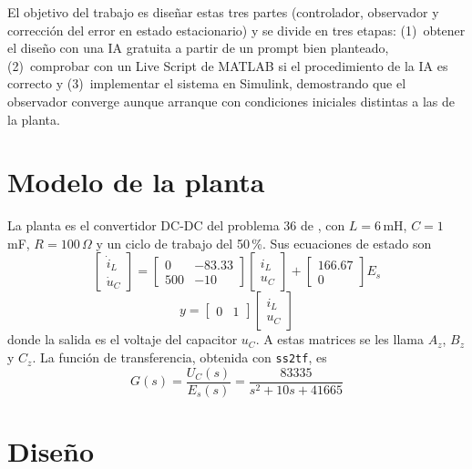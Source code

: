 \documentclass[conference]{IEEEtran}
\begin{document}
El objetivo del trabajo es diseñar estas tres partes (controlador, observador y corrección del error en estado estacionario) y se divide en tres etapas: (1)~obtener el diseño con una IA gratuita a partir de un prompt bien planteado, (2)~comprobar con un Live Script de MATLAB si el procedimiento de la IA es correcto y (3)~implementar el sistema en Simulink, demostrando que el observador converge aunque arranque con condiciones iniciales distintas a las de la planta.

\section{Modelo de la planta}

La planta es el convertidor DC-DC del problema 36 de \cite{nise}, con $L = 6$\,mH, $C = 1$\,mF, $R = 100\,\Omega$ y un ciclo de trabajo del 50\,\%. Sus ecuaciones de estado son
\begin{equation}
\begin{bmatrix} \dot{i}_L \\ \dot{u}_C \end{bmatrix} =
\begin{bmatrix} 0 & -83.33 \\ 500 & -10 \end{bmatrix}
\begin{bmatrix} i_L \\ u_C \end{bmatrix} +
\begin{bmatrix} 166.67 \\ 0 \end{bmatrix} E_s
\end{equation}
\begin{equation}
y = \begin{bmatrix} 0 & 1 \end{bmatrix} \begin{bmatrix} i_L \\ u_C \end{bmatrix}
\end{equation}
donde la salida es el voltaje del capacitor $u_C$. A estas matrices se les llama $A_z$, $B_z$ y $C_z$. La función de transferencia, obtenida con \texttt{ss2tf}, es
\begin{equation}
G(s) = \frac{U_C(s)}{E_s(s)} = \frac{83335}{s^2 + 10s + 41665}
\end{equation}

\section{Diseño}
\end{document}
